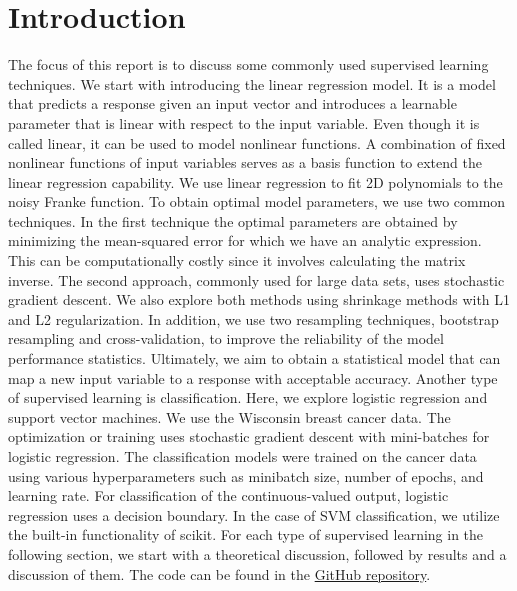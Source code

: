 \section{Introduction} \label{sec:introduction}

The focus of this report is to discuss some commonly used supervised learning techniques. \newline \newline
We start with introducing the linear regression model. It is a model that predicts a response given an input vector and introduces a learnable parameter that is linear with respect to the input variable. Even though it is called linear, it can be used to model nonlinear functions. A combination of fixed nonlinear functions of input variables serves as a basis function to extend the linear regression capability. We use linear regression to fit 2D polynomials to the noisy Franke function. To obtain optimal model parameters, we use two common techniques. In the first technique the optimal parameters are obtained by minimizing the mean-squared error for which we have an analytic expression. This can be computationally costly since it involves calculating the matrix inverse. The second approach, commonly used for large data sets, uses stochastic gradient descent. We also explore both methods using shrinkage methods with L1 and L2 regularization. In addition, we use two resampling techniques, bootstrap resampling and cross-validation, to improve the reliability of the model performance statistics. Ultimately, we aim to obtain a statistical model that can map a new input variable to a response with acceptable accuracy. \newline \newline
Another type of supervised learning is classification. Here, we explore logistic regression and support vector machines. We use the Wisconsin breast cancer data. The optimization or training uses stochastic gradient descent with mini-batches for logistic regression. The classification models were trained on the cancer data using various hyperparameters such as minibatch size, number of epochs, and learning rate. For classification of the continuous-valued output, logistic regression uses a decision boundary. In the case of SVM classification, we utilize the built-in functionality of scikit. \newline \newline
For each type of supervised learning in the following section, we start with a theoretical discussion, followed by results and a discussion of them. \newline \newline
The code can be found in the \href{https://github.com/am-kaiser/CompSci-Project-1}{GitHub repository}.
